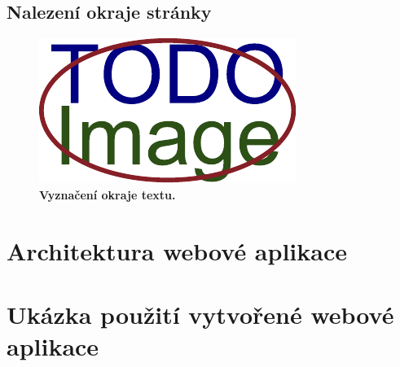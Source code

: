 \subsection*{Nalezení okraje stránky}

\dummyShortText[10]

\dummyText[2]

\begin{figure}[H]
    \centering
    \includegraphics[width=\linewidth]{obrazky-figures/placeholder.pdf}
    \caption{\textbf{Vyznačení okraje textu.} }
\end{figure}



\section{Architektura webové aplikace}

\dummyText

\dummyText[2]


\section{Ukázka použití vytvořené webové aplikace}

\dummyShortText[13]

\dummyText

